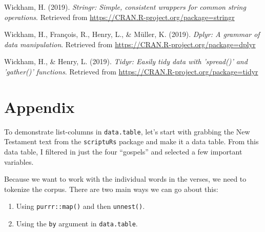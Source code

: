 \documentclass[doc]{apa6}
\newenvironment{Shaded}{\begin{snugshade}}{\end{snugshade}}
\newcommand{\KeywordTok}[1]{\textcolor[rgb]{0.13,0.29,0.53}{\textbf{#1}}}
\newcommand{\NormalTok}[1]{#1}
\newcommand{\OperatorTok}[1]{\textcolor[rgb]{0.81,0.36,0.00}{\textbf{#1}}}
\newcommand{\StringTok}[1]{\textcolor[rgb]{0.31,0.60,0.02}{#1}}
\providecommand{\tightlist}{%
  \setlength{\itemsep}{0pt}\setlength{\parskip}{0pt}}
\begin{document}
\leavevmode\hypertarget{ref-R-stringr}{}%
Wickham, H. (2019). \emph{Stringr: Simple, consistent wrappers for common string operations}. Retrieved from \url{https://CRAN.R-project.org/package=stringr}

\leavevmode\hypertarget{ref-R-dplyr}{}%
Wickham, H., François, R., Henry, L., \& Müller, K. (2019). \emph{Dplyr: A grammar of data manipulation}. Retrieved from \url{https://CRAN.R-project.org/package=dplyr}

\leavevmode\hypertarget{ref-R-tidyr}{}%
Wickham, H., \& Henry, L. (2019). \emph{Tidyr: Easily tidy data with 'spread()' and 'gather()' functions}. Retrieved from \url{https://CRAN.R-project.org/package=tidyr}

\endgroup

\newpage

\hypertarget{appendix}{%
\section{Appendix}\label{appendix}}

To demonstrate list-columns in \texttt{data.table}, let's start with grabbing the New Testament text from the \texttt{scriptuRs} package and make it a data table. From this data table, I filtered in just the four \enquote{gospels} and selected a few important variables.

\begin{Shaded}
\end{Shaded}

Because we want to work with the individual words in the verses, we need to tokenize the corpus. There are two main ways we can go about this:

\begin{enumerate}
\def\labelenumi{\arabic{enumi}.}
\tightlist
\item
  Using \texttt{purrr::map()} and then \texttt{unnest()}.
\item
  Using the \texttt{by} argument in \texttt{data.table}.
\end{enumerate}
\end{document}
